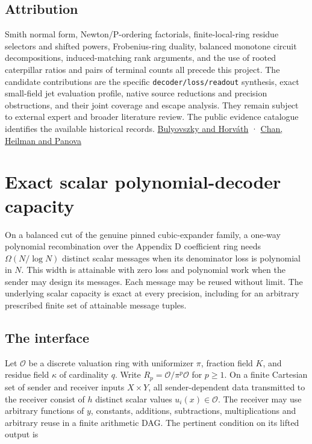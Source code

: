 \documentclass[
  11pt,
]{article}
\begin{document}
\subsection{Attribution}\label{v8-attribution}

Smith normal form, Newton/P-ordering factorials, finite-local-ring
residue selectors and shifted powers, Frobenius-ring duality, balanced
monotone circuit decompositions, induced-matching rank arguments, and
the use of rooted caterpillar ratios and pairs of terminal counts all
precede this project. The candidate contributions are the specific
\nolinkurl{decoder/loss/readout} synthesis, exact small-field jet
evaluation profile, native source reductions and precision obstructions,
and their joint coverage and escape analysis. They remain subject to
external expert and broader literature review. The public evidence
catalogue identifies the available historical records.
\href{https://doi.org/10.1016/j.tcs.2017.09.002}{Bulyovszky and Horváth}
· \href{https://arxiv.org/html/2604.19094}{Chan, Heilman and Panova}

\section{Exact scalar polynomial-decoder
capacity}\label{v8-section-nonlinear-budget}

On a balanced cut of the genuine pinned cubic-expander family, a one-way
polynomial recombination over the Appendix D coefficient ring needs
\(\Omega(N/\log N)\) distinct scalar messages when its denominator loss
is polynomial in \(N\). This width is attainable with zero loss and
polynomial work when the sender may design its messages. Each message
may be reused without limit. The underlying scalar capacity is exact at
every precision, including for an arbitrary prescribed finite set of
attainable message tuples.

\subsection{The interface}\label{v8-the-interface}

Let \(\mathcal O\) be a discrete valuation ring with uniformizer
\(\pi\), fraction field \(K\), and residue field \(\kappa\) of
cardinality \(q\). Write \(R_p=\mathcal O/\pi^p\mathcal O\) for
\(p\ge1\). On a finite Cartesian set of sender and receiver inputs
\(X\times Y\), all sender-dependent data transmitted to the receiver
consist of \(h\) distinct scalar values \(u_i(x)\in\mathcal O\). The
receiver may use arbitrary functions of \(y\), constants, additions,
subtractions, multiplications and arbitrary reuse in a finite arithmetic
DAG. The pertinent condition on its lifted output is
\end{document}
